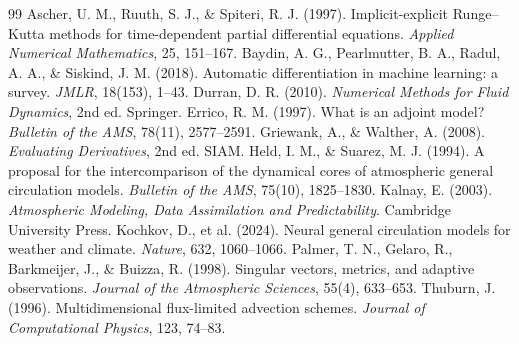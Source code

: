 \documentclass[11pt]{article}
\begin{document}
\begin{thebibliography}{99}
 Ascher, U. M., Ruuth, S. J., \& Spiteri,
  R. J. (1997). Implicit-explicit Runge--Kutta methods for time-dependent partial
  differential equations. \emph{Applied Numerical Mathematics}, 25, 151--167.
 Baydin, A. G., Pearlmutter, B. A., Radul,
  A. A., \& Siskind, J. M. (2018). Automatic differentiation in machine learning: a
  survey. \emph{JMLR}, 18(153), 1--43.
 Durran, D. R. (2010). \emph{Numerical Methods for
  Fluid Dynamics}, 2nd ed. Springer.
 Errico, R. M. (1997). What is an adjoint model?
  \emph{Bulletin of the AMS}, 78(11), 2577--2591.
 Griewank, A., \& Walther, A.
  (2008). \emph{Evaluating Derivatives}, 2nd ed. SIAM.
 Held, I. M., \& Suarez, M. J. (1994).
  A proposal for the intercomparison of the dynamical cores of atmospheric general
  circulation models. \emph{Bulletin of the AMS}, 75(10), 1825--1830.
 Kalnay, E. (2003). \emph{Atmospheric Modeling,
  Data Assimilation and Predictability}. Cambridge University Press.
 Kochkov, D., et al. (2024). Neural
  general circulation models for weather and climate. \emph{Nature}, 632, 1060--1066.
 Palmer, T. N., Gelaro, R., Barkmeijer, J.,
  \& Buizza, R. (1998). Singular vectors, metrics, and adaptive observations.
  \emph{Journal of the Atmospheric Sciences}, 55(4), 633--653.
 Thuburn, J. (1996). Multidimensional
  flux-limited advection schemes. \emph{Journal of Computational Physics}, 123,
  74--83.
\end{thebibliography}
\end{document}
